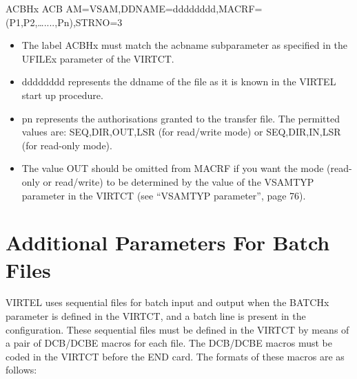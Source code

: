 \documentclass[letterpaper,10pt,english]{sphinxmanual}
\begin{document}
\begin{sphinxVerbatim}[commandchars=\\\{\}]
ACBHx ACB AM=VSAM,DDNAME=dddddddd,MACRF=(P1,P2,…....,Pn),STRNO=3
\end{sphinxVerbatim}
\begin{itemize}
\item {} 
The label ACBHx must match the acbname subparameter as specified in the UFILEx parameter of the VIRTCT.

\item {} 
dddddddd represents the ddname of the file as it is known in the VIRTEL start up procedure.

\item {} 
pn represents the authorisations granted to the transfer file. The permitted values are: SEQ,DIR,OUT,LSR (for read/write mode) or SEQ,DIR,IN,LSR (for read-only mode).

\item {} 
The value OUT should be omitted from MACRF if you want the mode (read-only or read/write) to be determined by the value of the VSAMTYP parameter in the VIRTCT (see “VSAMTYP parameter”, page 76).

\end{itemize}

\newpage
{}\label{\detokenize{Installation_Guide:vvrrig-bookmark72}}

\section{Additional Parameters For Batch Files}
\label{\detokenize{Installation_Guide:index-143}}\label{\detokenize{Installation_Guide:additional-parameters-for-batch-files}}
VIRTEL uses sequential files for batch input and output when the BATCHx parameter is defined in the VIRTCT, and a batch line is present in the configuration. These sequential files must be defined in the VIRTCT by means of a pair of DCB/DCBE macros for each file. The DCB/DCBE macros must be coded in the VIRTCT before the END card. The formats of these macros are as follows:

\begin{sphinxVerbatim}[commandchars=\\\{\}]
                             
  
\end{sphinxVerbatim}
\end{document}
